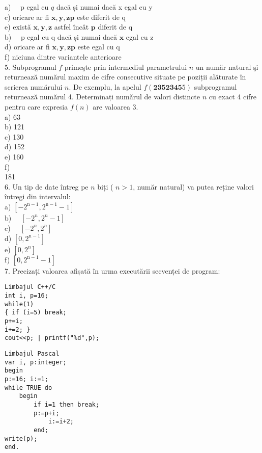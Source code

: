 a) $\quad \mathrm{p}$ egal cu $q$ dacă și numai dacă x egal cu y\\
c) oricare ar fi $\mathbf{x}, \mathbf{y}, \mathbf{z} \mathbf{p}$ este diferit de q\\
e) există $\mathbf{x}, \mathbf{y}, \mathbf{z}$ astfel încât $\mathbf{p}$ diferit de q\\
b) $\quad \mathrm{p}$ egal cu q dacă și numai dacă $\mathbf{x}$ egal cu z\\
d) oricare ar fi $\mathbf{x}, \mathbf{y}, \mathbf{z} \mathbf{p}$ este egal cu q\\
f) niciuna dintre variantele anterioare\\
5. Subprogramul $f$ primeşte prin intermediul parametrului $n$ un număr natural şi returnează numărul maxim de cifre consecutive situate pe poziții alăturate în scrierea numărului $n$. De exemplu, la apelul $f(\mathbf{2 3 5 2 3 4 5} 5)$ subprogramul returnează numărul 4. Determinați numărul de valori distincte $n$ cu exact 4 cifre pentru care expresia $f(n)$ are valoarea 3.\\
a) 63\\
b) 121\\
c) 130\\
d) 152\\
e) 160\\
f)\\
181\\
6. Un tip de date întreg pe $n$ biți ( $n>1$, număr natural) va putea reține valori întregi din intervalul:\\
a) $\left[-2^{\mathrm{n}-1}, 2^{\mathrm{n}-1}-1\right]$\\
b) $\quad\left[-2^{n}, 2^{n}-1\right]$\\
c) $\quad\left[-2^{n}, 2^{n}\right]$\\
d) $\left[0,2^{\mathrm{n}-1}\right]$\\
e) $\left[0,2^{n}\right]$\\
f) $\left[0,2^{\mathrm{n}-1}-1\right]$\\
7. Precizați valoarea afișată în urma executării secvenței de program:

\begin{verbatim}
Limbajul C++/C
int i, p=16;
while(1)
{ if (i=5) break;
p+=i;
i+=2; }
cout<<p; | printf("%d",p);
\end{verbatim}

\begin{verbatim}
Limbajul Pascal
var i, p:integer;
begin
p:=16; i:=1;
while TRUE do
    begin
        if i=1 then break;
        p:=p+i;
            i:=i+2;
        end;
write(p);
end.
\end{verbatim}

